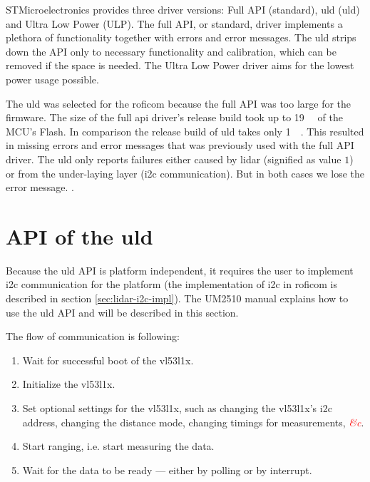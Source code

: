 \documentclass[
  digital,     %
  oneside,     %
  nosansbold,  %
  nocolorbold, %
  lof,         %
  lot,         %
]{fithesis4}
\newcommand{\TODO}[1]{\textcolor{red}{\textit{#1}}}
\begin{document}
{{{STMicroelectronics provides three driver versions: Full API (standard), \acrlong{uld} (\acrshort{uld}) and Ultra Low Power (ULP). The full API, or standard, driver implements a plethora of functionality together with errors and error messages. The \acrlong{uld} strips down the API only to necessary functionality and calibration, which can be removed if the space is needed. The Ultra Low Power driver aims for the lowest power usage possible.

The \acrlong{uld} was selected for the \acrshort{roficom} because the full API was too large for the firmware. The size of the full api driver's release build took up to \qty{19}{\kilo\byte} of the MCU's Flash. In comparison the release build of \acrlong{uld} takes only \qty{1}{\kilo\byte}. This resulted in missing errors and error messages that was previously used with the full API driver. The \acrshort{uld} only reports failures either caused by lidar (signified as value $1$) or from the under-laying layer (\acrshort{i2c} communication). But in both cases we lose the error message. .

\section[ API of the Ultra Lite Driver ]{ API of the \acrlong{uld} } \label{sec:lidar-api}
Because the \acrshort{uld} API is platform independent, it requires the user to implement \acrshort{i2c} communication for the platform (the implementation of \acrshort{i2c} in \acrshort{roficom} is described in section \ref{sec:lidar-i2c-impl}). The UM2510 \cite{um2510} manual explains how to use the \acrshort{uld} API and will be described in this section.

The flow of communication is following:
\begin{enumerate}
    \item Wait for successful boot of the \gls{vl53l1x}.
    
    \item Initialize the \gls{vl53l1x}.
    
    \item  Set optional settings for the \gls{vl53l1x}, such as changing the \gls{vl53l1x}'s \acrshort{i2c} address, changing the distance mode, changing timings for measurements, \TODO{\&c}.
    
    \item Start ranging, i.e. start measuring the data.
    
    \item Wait for the data to be ready --- either by polling or by interrupt.
    

\end{enumerate}}}}
\end{document}
